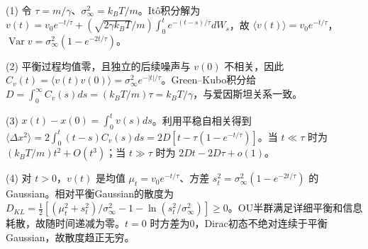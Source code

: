 (1) 令 \(\tau=m/\gamma\)、\(\sigma_\infty^2=k_BT/m\)。Itô积分解为 \(v(t)=v_0e^{-t/\tau}+(\sqrt{2\gamma k_BT}/m)\int_0^te^{-(t-s)/\tau}dW_s\)，故 \(\langle v(t)\rangle=v_0e^{-t/\tau}\)，\(\operatorname{Var}v=\sigma_\infty^2(1-e^{-2t/\tau})\)。

(2) 平衡过程均值零，且独立的后续噪声与 \(v(0)\) 不相关，因此 \(C_v(t)=\langle v(t)v(0)\rangle=\sigma_\infty^2e^{-|t|/\tau}\)。Green–Kubo积分给 \(D=\int_0^\infty C_v(s)ds=(k_BT/m)\tau=k_BT/\gamma\)，与爱因斯坦关系一致。

(3) \(x(t)-x(0)=\int_0^tv(s)ds\)。利用平稳自相关得到 \(\langle\Delta x^2\rangle=2\int_0^t(t-s)C_v(s)ds=2D[t-\tau(1-e^{-t/\tau})]\)。当 \(t\ll\tau\) 时为 \((k_BT/m)t^2+O(t^3)\)；当 \(t\gg\tau\) 时为 \(2Dt-2D\tau+o(1)\)。

(4) 对 \(t>0\)，\(v(t)\) 是均值 \(\mu_t=v_0e^{-t/\tau}\)、方差 \(s_t^2=\sigma_\infty^2(1-e^{-2t/\tau})\) 的Gaussian。相对平衡Gaussian的散度为 \(D_{KL}=\tfrac12[(\mu_t^2+s_t^2)/\sigma_\infty^2-1-\ln(s_t^2/\sigma_\infty^2)]\ge0\)。OU半群满足详细平衡和信息耗散，故随时间递减为零。\(t=0\) 时方差为0，Dirac初态不绝对连续于平衡Gaussian，故散度趋正无穷。
